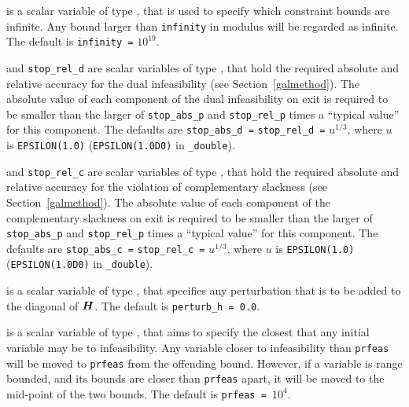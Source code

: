 \begin{description}
 is a scalar variable of type \realdp, that is used to
specify which constraint bounds are infinite.
Any bound larger than {\tt infinity} in modulus will be regarded as infinite.
The default is {\tt infinity =} $10^{19}$.


 and {\tt stop\_rel\_d}
are scalar variables of type \realdp, that hold the
required absolute and relative accuracy for the dual infeasibility
(see Section~\ref{galmethod}).
The absolute value of each component of the dual infeasibility
on exit is required to be smaller than the larger of {\tt stop\_abs\_p} and
{\tt stop\_rel\_p} times a ``typical value'' for this component.
The defaults are {\tt stop\_abs\_d =} {\tt stop\_rel\_d =} $u^{1/3}$,
where $u$ is {\tt EPSILON(1.0)} ({\tt EPSILON(1.0D0)} in
{\tt \fullpackagename\_double}).

 and {\tt stop\_rel\_c}
are scalar variables of type \realdp, that hold the
required absolute and relative accuracy
for the violation of complementary slackness
(see Section~\ref{galmethod}).
The absolute value of each component of the complementary slackness
on exit is required to be smaller than the larger of {\tt stop\_abs\_p} and
{\tt stop\_rel\_p} times a ``typical value'' for this component.
The defaults are {\tt stop\_abs\_c =} {\tt stop\_rel\_c =} $u^{1/3}$,
where $u$ is {\tt EPSILON(1.0)} ({\tt EPSILON(1.0D0)} in
{\tt \fullpackagename\_double}).

 is a scalar variable of type \realdp, that specifies
any perturbation that is to be added to the diagonal of ${\bm{H}}$.
The default is {\tt perturb\_h = 0.0}.

 is a scalar variable of type \realdp, that aims to specify
the closest that any initial variable may be to infeasibility. Any variable
closer to infeasibility than {\tt prfeas} will be moved to {\tt prfeas} from
the offending bound. However, if a variable is range bounded, and its bounds
are closer than {\tt prfeas} apart, it will be moved to the mid-point of the
two bounds.
The default is {\tt prfeas = $10^4$}.


\end{description}
